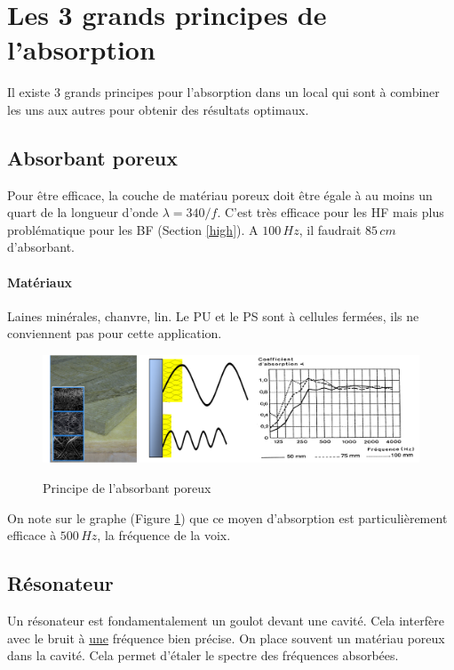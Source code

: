 \documentclass[11pt]{report}
\begin{document}
\newpage
\section{Les 3 grands principes de l'absorption}
Il existe 3 grands principes pour l'absorption dans un local qui sont à combiner les uns aux autres pour obtenir des résultats optimaux.
\subsection{Absorbant poreux}
Pour être efficace, la couche de matériau poreux doit être égale à au moins un quart de la longueur d'onde $\lambda = 340/f$. C'est très efficace pour les HF mais plus problématique pour les BF (Section \ref{high}). A $100\,Hz$, il faudrait $85\,cm$ d'absorbant.

\paragraph{Matériaux } Laines minérales, chanvre, lin. Le  PU et le PS sont à cellules fermées, ils ne conviennent pas pour cette application.

\begin{figure}[ht]
\centering
\includegraphics[width=0.8\linewidth]{abso}
\label{aaa}
\caption{Principe de l'absorbant poreux}
\end{figure}

On note sur le graphe (Figure \ref{aaa}) que ce moyen d'absorption est particulièrement efficace à $500\,Hz$, la fréquence de la voix.





\subsection{Résonateur}
Un résonateur est fondamentalement un goulot devant une cavité. Cela interfère avec le bruit à \underline{une} fréquence bien précise. On place souvent un matériau poreux dans la cavité. Cela permet d'étaler le spectre des fréquences absorbées. 
\end{document}
